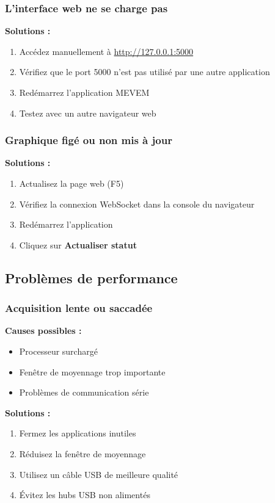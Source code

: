 \documentclass[12pt,a4paper]{article}
\begin{document}
\subsubsection{L'interface web ne se charge pas}

\textbf{Solutions :}
\begin{enumerate}
    \item Accédez manuellement à \url{http://127.0.0.1:5000}
    \item Vérifiez que le port 5000 n'est pas utilisé par une autre application
    \item Redémarrez l'application MEVEM
    \item Testez avec un autre navigateur web
\end{enumerate}

\subsubsection{Graphique figé ou non mis à jour}

\textbf{Solutions :}
\begin{enumerate}
    \item Actualisez la page web (F5)
    \item Vérifiez la connexion WebSocket dans la console du navigateur
    \item Redémarrez l'application
    \item Cliquez sur \textbf{Actualiser statut}
\end{enumerate}

\subsection{Problèmes de performance}

\subsubsection{Acquisition lente ou saccadée}

\textbf{Causes possibles :}
\begin{itemize}
    \item Processeur surchargé
    \item Fenêtre de moyennage trop importante
    \item Problèmes de communication série
\end{itemize}

\textbf{Solutions :}
\begin{enumerate}
    \item Fermez les applications inutiles
    \item Réduisez la fenêtre de moyennage
    \item Utilisez un câble USB de meilleure qualité
    \item Évitez les hubs USB non alimentés
\end{enumerate}
\end{document}
